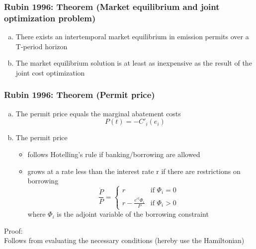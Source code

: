 \begin{frame}
\frametitle{Rubin 1996: Theorem (Market equilibrium and joint optimization problem)}
\begin{enumerate}[(a)]
\item There exists an intertemporal market equilibrium in emission permits over a T-period horizon
\item The market equilibrium solution is at least as inexpensive as the result of the joint cost optimization
\end{enumerate}
\end{frame}


\begin{frame}
\frametitle{Rubin 1996: Theorem (Permit price)}
\begin{enumerate}[(a)]
\item The permit price equals the marginal abatement costs
\[
P(t) = - C'_i(e_i)
\]
\item The permit price
\begin{itemize}
\item follows Hotelling's rule if banking/borrowing are allowed
\item grows at a rate less than the interest rate r if there are restrictions on borrowing
\[
\frac{\dot{P}}{P} =
		\left\{ \begin{array}{ll}
		  r  &
			  \mbox{if $\Phi_i = 0$ } \\
			r - \frac{e^{rt}\Phi_i}{P} &
			  \mbox{if $\Phi_i > 0$}
		\end{array}
	  \right.
\]
where $\Phi_i$ is the adjoint variable of the borrowing constraint
\end{itemize}
\end{enumerate}
Proof: \\
Follows from evaluating the necessary conditions (hereby use the Hamiltonian)
\end{frame}



